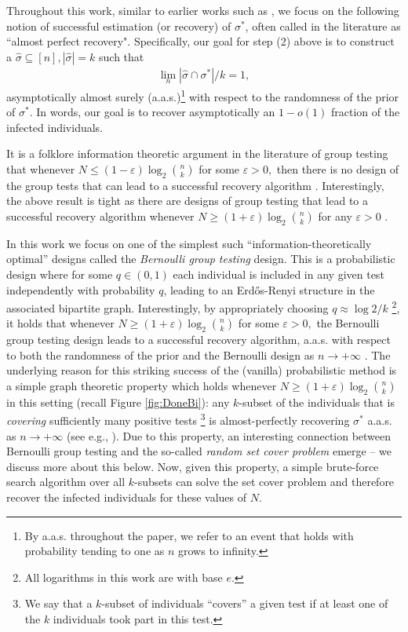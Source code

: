 \documentclass[12pt,reqno]{amsart}
\numberwithin{equation}{section}
\theoremstyle{definition}
\renewcommand{\epsilon}{\varepsilon}
\renewcommand{\[}{\begin{equation}}
\renewcommand{\]}{\end{equation}}
\renewcommand{\|}{\bigg{|}}
\begin{document}
Throughout this work, similar to earlier works such as \cite{scarlett2016phase, scarlett2018near, iliopoulos2021group, cojaoghlan2022statistical}, we focus on the following notion of successful estimation (or recovery) of $\sigma^*$, often called in the literature as ``almost perfect recovery". Specifically, our goal for step (2) above is to construct a $\hat{\sigma} \subseteq [n], |\hat{\sigma}|=k$ such that \begin{align}\label{eq:rec}
    \lim_n |\hat{\sigma}\cap \sigma^*|/k=1,
\end{align}
asymptotically almost surely (a.a.s.)\footnote{By a.a.s. throughout the paper, we refer to an event that holds with probability tending to one as $n$ grows to infinity.} with respect to the randomness of the prior of $\sigma^*$. In words, our goal is to recover asymptotically an $1-o(1)$ fraction of the infected individuals.

It is a folklore information theoretic argument in the literature of group testing that whenever $N \leq (1-\epsilon) \log_2 \binom{n}{k}$ for some $\epsilon>0,$ then there is no design of the group tests that can lead to a successful recovery algorithm \cite{Aldridge_2019,truong2020all, niles2023all}. Interestingly, the above result is tight as there are designs of group testing that lead to a successful recovery algorithm whenever $N \geq (1+\epsilon) \log_2 \binom{n}{k}$ for any $\epsilon>0$ \cite{Aldridge_2019}.

In this work we focus on one of the simplest such ``information-theoretically optimal'' designs called the \emph{Bernoulli group testing} design. This is a probabilistic design where for some $q \in (0,1)$ each individual is included in any given test independently with probability \( q \), leading to an Erd\H{o}s-Renyi structure in the associated bipartite graph. Interestingly, by appropriately choosing $q \approx \log 2/k$ \footnote{All logarithms in this work are with base $e$.}, it holds that whenever $N \geq (1+\epsilon) \log_2 \binom{n}{k}$ for some $\epsilon>0,$ the Bernoulli group testing design leads to a successful recovery algorithm, a.a.s. with respect to both the randomness of the prior and the Bernoulli design as $n \rightarrow +\infty$ \cite{Aldridge_2019}. The underlying reason for this striking success of the (vanilla) probabilistic method is a simple graph theoretic property which holds whenever $N \geq (1+\epsilon) \log_2 \binom{n}{k}$ in this setting (recall Figure \ref{fig:DoneBi}): any $k$-subset of the individuals that is \emph{covering} sufficiently many positive tests \footnote{We say that a $k$-subset of individuals ``covers'' a given test if at least one of the $k$ individuals took part in this test.} is almost-perfectly recovering $\sigma^*$ a.a.s. as $n \rightarrow +\infty$ (see e.g., \cite[Lemma 5]{iliopoulos2021group}). Due to this property, an interesting connection between Bernoulli group testing and the so-called \emph{random set cover problem} emerge -- we discuss more about this below. Now, given this property, a simple brute-force search algorithm over all $k$-subsets can solve the set cover problem and therefore recover the infected individuals for these values of $N$. 
\end{document}
